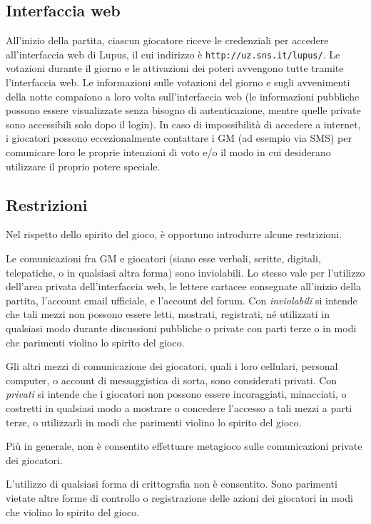 \documentclass[a4paper,10pt]{article}
\begin{document}
\subsection{Interfaccia web}

All'inizio della partita, ciascun giocatore riceve le credenziali per accedere all'interfaccia web di Lupus, il cui indirizzo è \verb|http://uz.sns.it/lupus/|.
Le votazioni durante il giorno e le attivazioni dei poteri avvengono tutte tramite l'interfaccia web. Le informazioni sulle votazioni del giorno e sugli avvenimenti della notte compaiono a loro volta sull'interfaccia web (le informazioni pubbliche possono essere visualizzate senza bisogno di autenticazione, mentre quelle private sono accessibili solo dopo il login). In caso di impossibilità di accedere a internet, i giocatori possono eccezionalmente contattare i GM (ad esempio via SMS) per comunicare loro le proprie intenzioni di voto e/o il modo in cui desiderano utilizzare il proprio potere speciale.

\subsection{Restrizioni}

Nel rispetto dello spirito del gioco, è opportuno introdurre alcune restrizioni.

Le comunicazioni fra GM e giocatori (siano esse verbali, scritte, digitali, telepatiche, o in qualsiasi altra forma) sono inviolabili. Lo stesso vale per l'utilizzo dell'area privata dell'interfaccia web, le lettere cartacee consegnate all'inizio della partita, l'account email ufficiale, e l'account del forum.
Con \emph{inviolabili} si intende che tali mezzi non possono essere letti, mostrati, registrati, né utilizzati in qualsiasi modo durante discussioni pubbliche o private con parti terze o in modi che parimenti violino lo spirito del gioco.

Gli altri mezzi di comunicazione dei giocatori, quali i loro cellulari, personal computer, o account di messaggistica di sorta, sono considerati privati.
Con \emph{privati} si intende che i giocatori non possono essere incoraggiati, minacciati, o costretti in qualsiasi modo a mostrare o concedere l'accesso a tali mezzi a parti terze, o utilizzarli in modi che parimenti violino lo spirito del gioco.

Più in generale, non è consentito effettuare metagioco sulle comunicazioni private dei giocatori.

L'utilizzo di qualsiasi forma di crittografia non è consentito. Sono parimenti vietate altre forme di controllo o registrazione delle azioni dei giocatori in modi che violino lo spirito del gioco.
\end{document}
